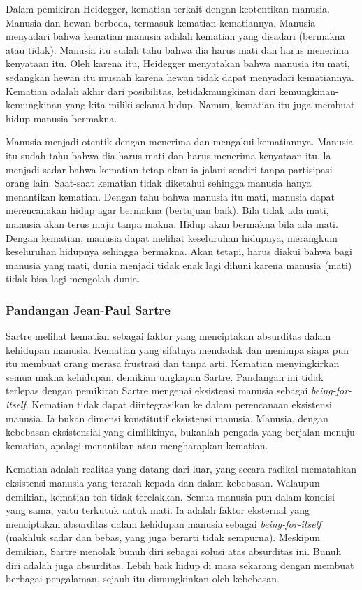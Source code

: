 \documentclass[10pt,a4paper]{article}
\begin{document}
\begin{multicols}{2}
Dalam pemikiran Heidegger, kematian terkait dengan keotentikan manusia.
Manusia dan hewan berbeda, termasuk kematian-kematiannya. Manusia
menyadari bahwa kematian manusia adalah kematian yang disadari (bermakna
atau tidak). Manusia itu sudah tahu bahwa dia harus mati dan harus
menerima kenyataan itu. Oleh karena itu, Heidegger menyatakan bahwa
manusia itu mati, sedangkan hewan itu musnah karena hewan tidak dapat
menyadari kematiannya. Kematian adalah akhir dari posibilitas,
ketidakmungkinan dari kemungkinan-kemungkinan yang kita miliki selama
hidup. Namun, kematian itu juga membuat hidup manusia bermakna.

Manusia menjadi otentik dengan menerima dan mengakui kematiannya.
Manusia itu sudah tahu bahwa dia harus mati dan harus menerima kenyataan
itu. la menjadi sadar bahwa kematian tetap akan ia jalani sendiri tanpa
partisipasi orang lain. Saat-saat kematian tidak diketahui sehingga
manusia hanya menantikan kematian. Dengan tahu bahwa manusia itu mati,
manusia dapat merencanakan hidup agar bermakna (bertujuan baik). Bila
tidak ada mati, manusia akan terus maju tanpa makna. Hidup akan bermakna
bila ada mati. Dengan kematian, manusia dapat melihat keseluruhan
hidupnya, merangkum keseluruhan hidupnya sehingga bermakna. Akan tetapi,
harus diakui bahwa bagi manusia yang mati, dunia menjadi tidak enak lagi
dihuni karena manusia (mati) tidak bisa lagi mengolah dunia.

\hypertarget{pandangan-jean-paul-sartre-1}{%
\subsubsection{Pandangan Jean-Paul
Sartre}\label{pandangan-jean-paul-sartre-1}}

Sartre melihat kematian sebagai faktor yang menciptakan absurditas dalam
kehidupan manusia. Kematian yang sifatnya mendadak dan menimpa siapa pun
itu membuat orang merasa frustrasi dan tanpa arti. Kematian
menyingkirkan semua makna kehidupan, demikian ungkapan Sartre. Pandangan
ini tidak terlepas dengan pemikiran Sartre mengenai eksistensi manusia
sebagai \emph{being-for-itself}. Kematian tidak dapat diintegrasikan ke
dalam perencanaan eksistensi manusia. Ia bukan dimensi konstitutif
eksistensi manusia. Manusia, dengan kebebasan eksistensial yang
dimilikinya, bukanlah pengada yang berjalan menuju kematian, apalagi
menantikan atau mengharapkan kematian.

Kematian adalah realitas yang datang dari luar, yang secara radikal
mematahkan eksistensi manusia yang terarah kepada dan dalam kebebasan.
Walaupun demikian, kematian toh tidak terelakkan. Semua manusia pun
dalam kondisi yang sama, yaitu terkutuk untuk mati. Ia adalah faktor
eksternal yang menciptakan absurditas dalam kehidupan manusia sebagai
\emph{being-for-itself} (makhluk sadar dan bebas, yang juga berarti
tidak sempurna). Meskipun demikian, Sartre menolak bunuh diri sebagai
solusi atas absurditas ini. Bunuh diri adalah juga absurditas. Lebih
baik hidup di masa sekarang dengan membuat berbagai pengalaman, sejauh
itu dimungkinkan oleh kebebasan.


\end{multicols}
\end{document}
